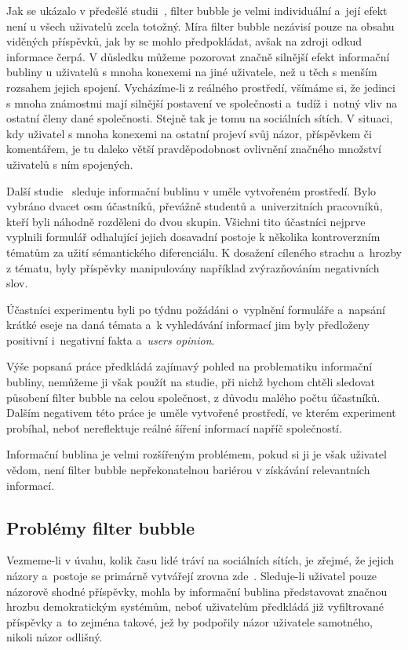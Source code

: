 \documentclass[12pt, a4paper]{article}
\numberwithin{equation}{section} 	%
\begin{document}
Jak se ukázalo v předešlé studii~\cite{TheImpactOfFilterBubble}, filter bubble je velmi individuální a~její efekt není u všech uživatelů zcela totožný. Míra filter bubble nezávisí pouze na obsahu viděných příspěvků, jak by se mohlo předpokládat, avšak na zdroji odkud informace čerpá. V důsledku můžeme pozorovat značně silnější efekt informační bubliny u uživatelů s mnoha konexemi na jiné uživatele, než u těch s menším rozsahem jejich spojení. Vycházíme-li z reálného prostředí, všímáme si, že jedinci s mnoha známostmi mají silnější postavení ve společnosti a~tudíž i~notný vliv na ostatní členy dané společnosti. Stejně tak je tomu na sociálních sítích. V situaci, kdy uživatel s mnoha konexemi na ostatní projeví svůj názor, příspěvkem či komentářem, je tu daleko větší pravděpodobnost ovlivnění značného množství uživatelů s ním spojených.

Další studie~\cite{BeyondFilterBubble} sleduje informační bublinu v uměle vytvořeném prostředí. Bylo vybráno dvacet osm účastníků, převážně studentů a~univerzitních pracovníků, kteří byli náhodně rozděleni do dvou skupin. Všichni tito účastníci nejprve vyplnili formulář odhalující jejich dosavadní postoje k několika kontroverzním tématům za užití sémantického diferenciálu. K dosažení cíleného strachu a~hrozby z tématu, byly příspěvky manipulovány například zvýrazňováním negativních slov.

Účastníci experimentu byli po týdnu požádáni o~vyplnění formuláře a~napsání krátké eseje na daná témata a~k vyhledávání informací jim byly předloženy positivní i~negativní fakta a~\textit{users opinion}.

Výše popsaná práce předkládá zajímavý pohled na problematiku informační bubliny, nemůžeme ji však použít na studie, při nichž bychom chtěli sledovat působení filter bubble na celou společnost, z důvodu malého počtu účastníků. Dalším negativem této práce je uměle vytvořené prostředí, ve kterém experiment probíhal, neboť nereflektuje reálné šíření informací napříč společností.

Informační bublina je velmi rozšířeným problémem, pokud si ji je však uživatel vědom, není filter bubble nepřekonatelnou bariérou v získávání relevantních informací.


\subsection{Problémy filter bubble}
Vezmeme-li v úvahu, kolik času lidé tráví na sociálních sítích, je zřejmé, že jejich názory a~postoje se primárně vytvářejí zrovna zde~\cite{TheImpactOfFilterBubble, BeyondFilterBubble, whyNewsOnTwitter}. Sleduje-li uživatel pouze názorově shodné příspěvky, mohla by informační bublina před\-sta\-vo\-vat značnou hrozbu demokratickým systémům, neboť uživatelům předkládá již vyfiltrované příspěvky a~to zejména takové, jež by podpořily názor uživatele samotného, nikoli názor odlišný.
\end{document}
